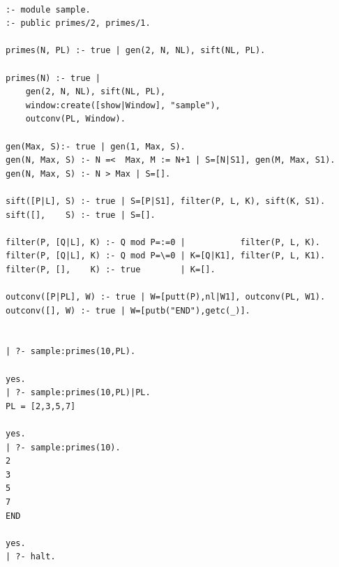 \newpage
{}
\begin{verbatim}

:- module sample.
:- public primes/2, primes/1.

primes(N, PL) :- true | gen(2, N, NL), sift(NL, PL).

primes(N) :- true | 
    gen(2, N, NL), sift(NL, PL), 
    window:create([show|Window], "sample"),
    outconv(PL, Window).

gen(Max, S):- true | gen(1, Max, S).
gen(N, Max, S) :- N =<  Max, M := N+1 | S=[N|S1], gen(M, Max, S1).
gen(N, Max, S) :- N > Max | S=[].

sift([P|L], S) :- true | S=[P|S1], filter(P, L, K), sift(K, S1).
sift([],    S) :- true | S=[].

filter(P, [Q|L], K) :- Q mod P=:=0 |           filter(P, L, K).
filter(P, [Q|L], K) :- Q mod P=\=0 | K=[Q|K1], filter(P, L, K1).
filter(P, [],    K) :- true        | K=[].

outconv([P|PL], W) :- true | W=[putt(P),nl|W1], outconv(PL, W1).
outconv([], W) :- true | W=[putb("END"),getc(_)].


| ?- sample:primes(10,PL).

yes.
| ?- sample:primes(10,PL)|PL.
PL = [2,3,5,7]

yes.
| ?- sample:primes(10).
2
3
5
7
END

yes.
| ?- halt.

\end{verbatim}

